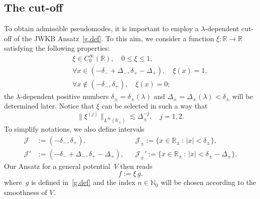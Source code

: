 \subsection{The cut-off}
To obtain admissible pseudomodes, 
it is important to employ a $\lambda$-dependent cut-off 
of the JWKB Ansatz~\eqref{g.def}.
To this aim, we consider a function $\xi:{\mathbb{R}}\to{\mathbb{R}}$ satisfying
the following  properties: 
\begin{equation}\label{xi.def}
\begin{aligned}
& \xi \in C_0^\infty({\mathbb{R}}), \quad 0 \leq \xi \leq 1, 
\\
&\forall x \in (-\delta_- +\Delta_-,\delta_+ -\Delta_+), \quad \xi(x) =1,  
\\
\qquad 
& \forall x \notin (-\delta_-,\delta_+), \quad \xi(x)=0; 
\end{aligned}
\end{equation}
the $\lambda$-dependent positive
numbers $\delta_\pm=\delta_\pm(\lambda)$ 
and $\Delta_\pm=\Delta_\pm(\lambda) <\delta_\pm$ 
will be determined later. Notice that $\xi$ can be selected in such a way that
\begin{equation}\label{xi.der}
\|\xi^{(j)}\|_{L^\infty({\mathbb{R}}_\pm)} {\lesssim} \Delta_\pm^{-j}, \quad j=1,2 .
\end{equation}
To simplify notations, we also define intervals
\begin{equation}\label{J.def}
\begin{aligned}
{\mathcal J}&:=
(-\delta_-,\delta_+),& &{\mathcal J}_\pm :=\{x \in {\mathbb{R}}_\pm \, : \, |x| < \delta_\pm \},
\\
{\mathcal J}'&:=
(-\delta_- + \Delta_-,\delta_+ -\Delta_+), && {\mathcal J}_\pm':=\{x \in {\mathbb{R}}_\pm \, : \, |x| < \delta_\pm-\Delta_\pm \}.
\end{aligned}
\end{equation}
Our Ansatz for a general potential~$V$ then reads 
\begin{equation}\label{Ansatz}
f := \xi \,  g.
\end{equation}
where~$g$ is defined in~\eqref{g.def} and the index $n \in {\mathbb{N}}_0$
will be chosen according to the smoothness of $V$.

